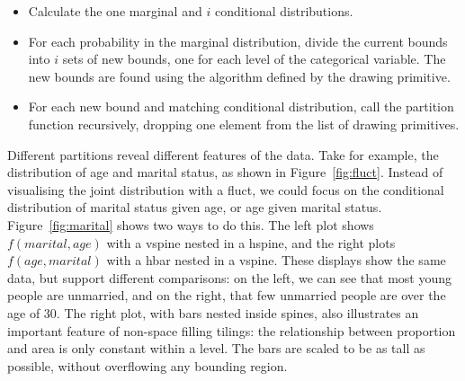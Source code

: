 \documentclass[journal]{vgtc}
\begin{document}
\begin{itemize}
  \item Calculate the one marginal and $i$ conditional distributions.

  \item For each probability in the marginal distribution, divide the current bounds into $i$ sets of new bounds, one for each level of the categorical variable. The new bounds are found using the algorithm defined by the drawing primitive.

  \item For each new bound and matching conditional distribution, call the partition function recursively, dropping one element from the list of drawing primitives.

\end{itemize}

Different partitions reveal different features of the data. Take for example, the distribution of age and marital status, as shown in Figure~\ref{fig:fluct}. Instead of visualising the joint distribution with a fluct, we could focus on the conditional distribution of marital status given age, or age given marital status. Figure~\ref{fig:marital} shows two ways to do this. The left plot shows $f(marital, age)$ with a vspine nested in a hspine, and the right plots $f(age, marital)$ with a hbar nested in a vspine. These displays show the same data, but support different comparisons: on the left, we can see that most young people are unmarried, and on the right, that few unmarried people are over the age of 30. The right plot, with bars nested inside spines, also illustrates an important feature of non-space filling tilings: the relationship between proportion and area is only constant within a level. The bars are scaled to be as tall as possible, without overflowing any bounding region.
\end{document}
